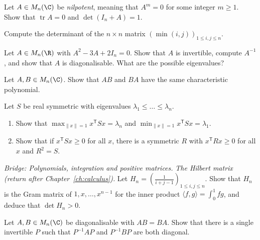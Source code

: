 \begin{exercise}[$\star$]\label{ex:nilp}
Let $A\in M_n(\C)$ be \emph{nilpotent}, meaning that $A^m=0$ for some integer $m\ge1$. Show that $\operatorname{tr}A=0$ and $\det(I_n+A)=1$.
\end{exercise}

\begin{exercise}[$\star$]\label{ex:mindet}
Compute the determinant of the $n\times n$ matrix $\left(\min(i,j)\right)_{1\le i,j\le n}$.
\end{exercise}

\begin{exercise}[$\star\star$]\label{ex:annul}
Let $A\in M_n(\R)$ with $A^2-3A+2I_n=0$. Show that $A$ is invertible, compute $A^{-1}$, and show that $A$ is diagonalisable. What are the possible eigenvalues?
\end{exercise}

\begin{exercise}[$\star\star$]\label{ex:abba}
Let $A,B\in M_n(\C)$. Show that $AB$ and $BA$ have the same characteristic polynomial.
\end{exercise}

\begin{exercise}[$\star\star$]\label{ex:rayleigh}
Let $S$ be real symmetric with eigenvalues $\lambda_1\le\dots\le\lambda_n$.
\begin{enumerate}[label=(\alph*)]
\item Show that $\max_{\|x\|=1}x^{\mathsf T}Sx=\lambda_n$ and $\min_{\|x\|=1}x^{\mathsf T}Sx=\lambda_1$.
\item Show that if $x^{\mathsf T}Sx\ge0$ for all $x$, there is a symmetric $R$ with $x^{\mathsf T}Rx\ge0$ for all $x$ and $R^2=S$.
\end{enumerate}
\end{exercise}

\begin{exercise}[$\star\star\star$]\label{ex:hilbert}
\emph{Bridge: Polynomials, integration and positive matrices.}
\emph{The Hilbert matrix (return after Chapter~\ref{ch:calculus}).} Let $H_n=\left(\frac1{i+j-1}\right)_{1\le i,j\le n}$. Show that $H_n$ is the Gram matrix of $1,x,\dots,x^{n-1}$ for the inner product
$\langle f,g\rangle=\int_0^1fg$, and deduce that $\det H_n>0$.
\end{exercise}

\begin{exercise}[$\star\star\star$]\label{ex:codiag}
Let $A,B\in M_n(\C)$ be diagonalisable with $AB=BA$. Show that there is a single invertible $P$ such that $P^{-1}AP$ and $P^{-1}BP$ are both diagonal.
\end{exercise}

